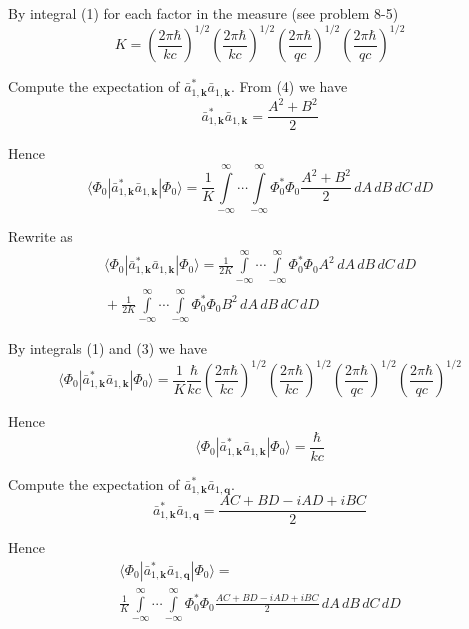 \documentclass[12pt]{article}
\begin{document}
By integral (1) for each factor in the measure (see problem 8-5)
\begin{equation*}
K=
\left(\frac{2\pi\hbar}{kc}\right)^{1/2}
\left(\frac{2\pi\hbar}{kc}\right)^{1/2}
\left(\frac{2\pi\hbar}{qc}\right)^{1/2}
\left(\frac{2\pi\hbar}{qc}\right)^{1/2}
\end{equation*}

Compute the expectation of $\bar a_{1,\mathbf k}^*\bar a_{1,\mathbf k}$.
From (4) we have
\begin{equation*}
\bar a_{1,\mathbf k}^*\bar a_{1,\mathbf k}=\frac{A^2+B^2}{2}
\end{equation*}

Hence
\begin{equation*}
\langle\Phi_0|\bar a_{1,\mathbf k}^*\bar a_{1,\mathbf k}|\Phi_0\rangle
=\frac{1}{K}\int\limits_{-\infty}^\infty\cdots\int\limits_{-\infty}^\infty
\Phi_0^*\Phi_0
\frac{A^2+B^2}{2}
\,dA\,dB\,dC\,dD
\end{equation*}

Rewrite as
\begin{multline*}
\langle\Phi_0|\bar a_{1,\mathbf k}^*\bar a_{1,\mathbf k}|\Phi_0\rangle
=\frac{1}{2K}
\int\limits_{-\infty}^\infty\cdots\int\limits_{-\infty}^\infty
\Phi_0^*\Phi_0
A^2
\,dA\,dB\,dC\,dD
\\{}+
\frac{1}{2K}
\int\limits_{-\infty}^\infty\cdots\int\limits_{-\infty}^\infty
\Phi_0^*\Phi_0
B^2
\,dA\,dB\,dC\,dD
\end{multline*}

By integrals (1) and (3) we have
\begin{equation*}
\langle\Phi_0|\bar a_{1,\mathbf k}^*\bar a_{1,\mathbf k}|\Phi_0\rangle
=\frac{1}{K}\frac{\hbar}{kc}\left(\frac{2\pi\hbar}{kc}\right)^{1/2}
\left(\frac{2\pi\hbar}{kc}\right)^{1/2}
\left(\frac{2\pi\hbar}{qc}\right)^{1/2}
\left(\frac{2\pi\hbar}{qc}\right)^{1/2}
\end{equation*}

Hence
\begin{equation*}
\langle\Phi_0|\bar a_{1,\mathbf k}^*\bar a_{1,\mathbf k}|\Phi_0\rangle=\frac{\hbar}{kc}
\tag{5}
\end{equation*}

Compute the expectation of $\bar a_{1,\mathbf k}^*\bar a_{1,\mathbf q}$.
\begin{equation*}
\bar a_{1,\mathbf k}^*\bar a_{1,\mathbf q}
=\frac{AC+BD-iAD+iBC}{2}
\end{equation*}

Hence
\begin{multline*}
\langle\Phi_0|\bar a_{1,\mathbf k}^*\bar a_{1,\mathbf q}|\Phi_0\rangle=
\\
\frac{1}{K}\int\limits_{-\infty}^\infty\cdots\int\limits_{-\infty}^\infty
\Phi_0^*\Phi_0
\frac{AC+BD-iAD+iBC}{2}
\,dA\,dB\,dC\,dD
\end{multline*}
\end{document}
